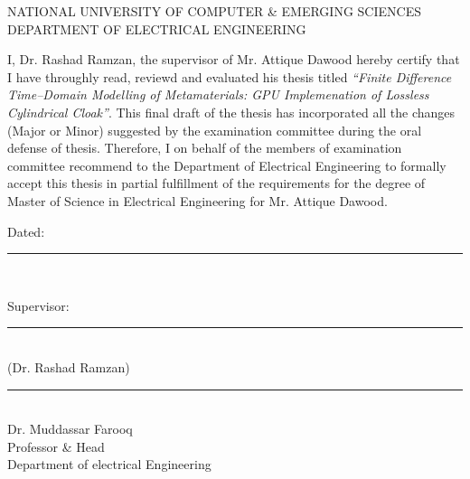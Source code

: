 \begin{center}
{NATIONAL UNIVERSITY OF COMPUTER \& EMERGING SCIENCES\\DEPARTMENT OF ELECTRICAL ENGINEERING}\\[0.5cm]
\end{center}

I, Dr. Rashad Ramzan, the supervisor of Mr. Attique Dawood hereby certify that I have throughly read, reviewd and evaluated his thesis titled \emph{``Finite Difference Time--Domain Modelling of Metamaterials: GPU Implemenation of Lossless Cylindrical Cloak''}. This final draft of the thesis has incorporated all the changes (Major or Minor) suggested by the examination committee during the oral defense of thesis. Therefore, I on behalf of the members of examination committee recommend to the Department of Electrical Engineering to formally accept this thesis in partial fulfillment of the requirements for the degree of Master of Science in Electrical Engineering for Mr. Attique Dawood.\\[0.1cm]
\begin{flushright}
Dated:~\rule{3cm}{0.2mm}\\[2cm]
\end{flushright}
\begin{center}
Supervisor:~\rule{5cm}{0.2mm}\\
\hspace{1.8cm}
(Dr. Rashad Ramzan)\\[3cm]
\rule{5cm}{0.2mm}\\
Dr. Muddassar Farooq\\
Professor \& Head\\
Department of electrical Engineering
\end{center}